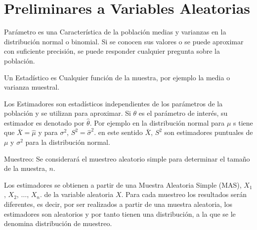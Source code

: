 
\section{Preliminares a Variables Aleatorias}

\begin{Def}
Par\'ametro es una Caracter\'istica de la poblaci\'on medias y varianzas en la distribuci\'on normal o binomial. Si se conocen sus valores o se puede aproximar con suficiente precisi\'on, se puede responder cualquier pregunta sobre la poblaci\'on.
\end{Def}

\begin{Def}
Un Estad\'istico es  Cualquier funci\'on de la muestra, por ejemplo la media o varianza muestral.
\end{Def}

\begin{Def} Los Estimadores son estad\'isticos independientes de los par\'ametros de la poblaci\'on y se utilizan para aproximar. Si $\theta$ es el par\'ametro de inter\'es, su estimador es denotado por $\hat{\theta}$. Por ejemplo en la  distribuci\'on normal para $\mu$ s tiene que  $\bar{X} = \hat{\mu}$ y para $\sigma^2$, $S^2 = \hat{\sigma}^2$. en este sentido $\bar{X}$, $S^2$ son estimadores puntuales de $\mu$ y $\sigma^2$ para la distribuci\'on normal.
\end{Def}

\begin{Def} Muestreo: Se considerar\'a el muestreo aleatorio simple para determinar el tama\~no de la muestra, $n$.
\end{Def}


Los estimadores se obtienen a partir de una Muestra Aleatoria Simple (MAS), $X_1$, $X_2$, $\ldots$, $X_n$. de  la variable aleatoria $X$. Para cada muestreo los resultados ser\'an diferentes, es decir, por ser realizados a partir de una muestra aleatoria, los estimadores son aleatorios y por tanto tienen una distribuci\'on, a la que se le denomina distribuci\'on de muestreo.


